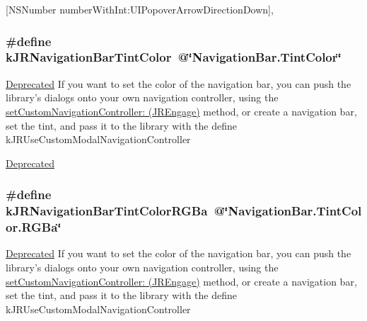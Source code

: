 \mbox{[}NSNumber numberWithInt:UIPopoverArrowDirectionDown\mbox{]}, \hypertarget{group__custom_interface_ga7c7ed7dac155537c9bc14531c5cec3cb}{
\subsubsection[{kJRNavigationBarTintColor}]{\setlength{\rightskip}{0pt plus 5cm}\#define kJRNavigationBarTintColor~@\char`\"{}NavigationBar.TintColor\char`\"{}}}
\label{group__custom_interface_ga7c7ed7dac155537c9bc14531c5cec3cb}
\begin{Desc}
\item[\hyperlink{deprecated__deprecated000001}{Deprecated}]If you want to set the color of the navigation bar, you can push the library's dialogs onto your own navigation controller, using the \hyperlink{class_j_r_engage_a6c704bbff377d20603e6b52bd0ae17f1}{setCustomNavigationController: (JREngage)} method, or create a navigation bar, set the tint, and pass it to the library with the define kJRUseCustomModalNavigationController \end{Desc}
\begin{Desc}
\item[\hyperlink{deprecated__deprecated000002}{Deprecated}]\end{Desc}
\hypertarget{group__custom_interface_gabda4f66c5cde44bbeaa6a993f4793ac5}{
\subsubsection[{kJRNavigationBarTintColorRGBa}]{\setlength{\rightskip}{0pt plus 5cm}\#define kJRNavigationBarTintColorRGBa~@\char`\"{}NavigationBar.TintColor.RGBa\char`\"{}}}
\label{group__custom_interface_gabda4f66c5cde44bbeaa6a993f4793ac5}
\begin{Desc}
\item[\hyperlink{deprecated__deprecated000003}{Deprecated}]If you want to set the color of the navigation bar, you can push the library's dialogs onto your own navigation controller, using the \hyperlink{class_j_r_engage_a6c704bbff377d20603e6b52bd0ae17f1}{setCustomNavigationController: (JREngage)} method, or create a navigation bar, set the tint, and pass it to the library with the define kJRUseCustomModalNavigationController \end{Desc}
